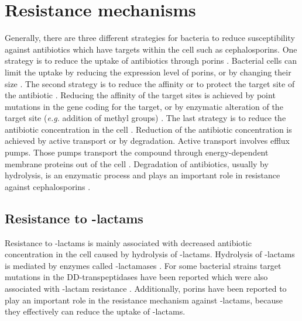 \section{Resistance mechanisms}
Generally, there are three different strategies for bacteria to reduce susceptibility against antibiotics which have targets within the cell such as cephalosporins. One strategy is to reduce the uptake of antibiotics through porins \cite{barreteau_cytoplasmic_2008}. Bacterial cells can limit the uptake by reducing the expression level of porins, or by changing their size \cite{fernandez_adaptive_2012}. The second strategy is to reduce the affinity or to protect the target site of the antibiotic \cite{munita_mechanisms_2016}. Reducing the affinity of the target sites is achieved by point mutations in the gene coding for the target, or by enzymatic alteration of the target site (\textit{e.g.} addition of methyl groups) \cite{munita_mechanisms_2016}. The last strategy is to reduce the antibiotic concentration in the cell \cite{munita_mechanisms_2016}. Reduction of the antibiotic concentration is achieved by active transport or by degradation. Active transport involves efflux pumps. Those pumps transport the compound through energy-dependent membrane proteins out of the cell \cite{fernandez_adaptive_2012}. Degradation of antibiotics, usually by hydrolysis, is an enzymatic process and plays an important role in resistance against cephalosporins \cite{poole_resistance_2004}.  
\subsection{Resistance to \textbeta-lactams}
Resistance to \textbeta-lactams is mainly associated with decreased antibiotic concentration in the cell caused by hydrolysis of \textbeta-lactams. Hydrolysis of \textbeta-lactams is mediated by enzymes called \textbeta-lactamases \cite{poole_resistance_2004}. For some bacterial strains target mutations in the DD-transpeptidases have been reported which were also associated with \textbeta-lactam resistance \cite{poole_resistance_2004}. Additionally, porins have been reported to play an important role in the resistance mechanism against \textbeta-lactams, because they effectively can reduce the uptake of \textbeta-lactams\cite{poole_resistance_2004}.
